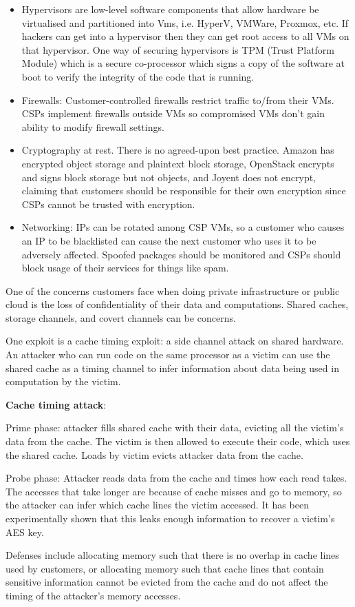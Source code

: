 \documentclass[../notes.tex]{subfiles}
\begin{document}
\begin{itemize}
    \item Hypervisors are low-level software components that allow hardware be virtualised and partitioned into Vms, i.e. HyperV, VMWare, Proxmox, etc.
If hackers can get into a hypervisor then they can get root access to all VMs on that hypervisor.
One way of securing hypervisors is TPM (Trust Platform Module) which is a secure co-processor which signs a copy of the software at boot to verify the integrity of the code that is running.
\item Firewalls: Customer-controlled firewalls restrict traffic to/from their VMs. CSPs implement firewalls outside VMs so compromised VMs don't gain ability to modify firewall settings.
\item Cryptography at rest. There is no agreed-upon best practice. Amazon has encrypted object storage and plaintext block storage, OpenStack encrypts and signs block storage but not objects, and Joyent does not encrypt, claiming that customers should be responsible for their own encryption since CSPs cannot be trusted with encryption. 
\item Networking: IPs can be rotated among CSP VMs, so a customer who causes an IP to be blacklisted can cause the next customer who uses it to be adversely affected. Spoofed packages should be monitored and CSPs should block usage of their services for things like spam.
\end{itemize}

One of the concerns customers face when doing private infrastructure or public cloud is the loss of confidentiality of their data and computations. Shared caches, storage channels, and covert channels can be concerns.


One exploit is a cache timing exploit: a side channel attack on shared hardware.
An attacker who can run code on the same processor as a victim can use the shared cache as a timing channel to infer information about data being used in computation by the victim.


\begin{definition}
    \textbf{Cache timing attack}:

    Prime phase: attacker fills shared cache with their data, evicting all the victim's data from the cache. The victim is then allowed to execute their code, which uses the shared cache. Loads by victim evicts attacker data from the cache.


    Probe phase:
    Attacker reads data from the cache and times how each read takes. The accesses that take longer are because of cache misses and go to memory, so the attacker can infer which cache lines the victim accessed. It has been experimentally shown that this leaks enough information to recover a victim's AES key.

    Defenses include allocating memory such that there is no overlap in cache lines used by customers, or allocating memory such that cache lines that contain sensitive information cannot be evicted from the cache and do not affect the timing of the attacker's memory accesses.

\end{definition}
\end{document}
